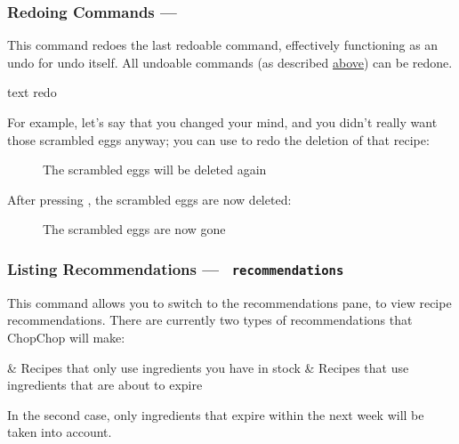 
\pagebreak
\hypertarget{RedoCommand}{}
\subsubsection{Redoing Commands — \texttt{}}
	This command redoes the last redoable command, effectively functioning as an undo for undo itself. All undoable commands
	(as described \hyperlink{UndoCommand}{above}) can be redone.

	 \begin{blockofcode}{text}
		redo
	\end{blockofcode}

	For example, let's say that you changed your mind, and you didn't really want those scrambled eggs anyway; you can use 
	to redo the deletion of that recipe:

	\begin{figure}[!htbp]\centering\ContinuedFloat*
		\caption{The scrambled eggs will be deleted again}
	\end{figure}

	\pagebreak
	After pressing , the scrambled eggs are now deleted:

	\begin{figure}[!htbp]\centering\ContinuedFloat
		\caption{The scrambled eggs are now gone}
	\end{figure}





\hypertarget{ListRecommendationCommand}{}
\subsubsection{Listing Recommendations — \texttt{ recommendations}}

	This command allows you to switch to the recommendations pane, to view recipe recommendations. There are currently two types
	of recommendations that ChopChop will make:

	\begin{romanlist}
		& Recipes that only use ingredients you have in stock
		& Recipes that use ingredients that are about to expire
	\end{romanlist}

	In the second case, only ingredients that expire within the next week will be taken into account.

